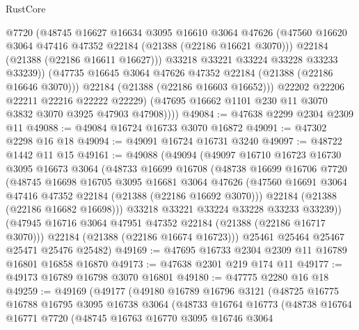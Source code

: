 \begin{lexlean}{RustCore}
\begin{coremodule}
                  @7720
                  (@48745
                    @16627
                    @16634
                    @3095
                    @16610
                    @3064
                    @47626
                    (@47560 @16620 @3064 @47416 @47352 @22184 (@21388 (@22186 @16621 @3070)))
                    @22184
                    (@21388 (@22186 @16611 @16627)))
                  @33218
                  @33221
                  @33224
                  @33228
                  @33233
                  @33239))
              (@47735 @16645 @3064 @47626 @47352 @22184 (@21388 (@22186 @16646 @3070)))
              @22184
              (@21388 (@22186 @16603 @16652)))
            @22202
            @22206
            @22211
            @22216
            @22222
            @22229)
          (@47695 @16662 @1101 @230 @11 @3070 @3832 @3070 @3925 @47903 @47908))))
@49084 := @47638 @2299 @2304 @2309 @11
@49088 := @49084 @16724 @16733 @3070 @16872
@49091 := @47302 @2298 @16 @18
@49094 := @49091 @16724 @16731 @3240
@49097 := @48722 @1442 @11 @15
@49161 := @49088
    (@49094
      (@49097
        @16710
        @16723
        @16730
        @3095
        @16673
        @3064
        (@48733
          @16699
          @16708
          (@48738
            @16699
            @16706
            @7720
            (@48745
              @16698
              @16705
              @3095
              @16681
              @3064
              @47626
              (@47560 @16691 @3064 @47416 @47352 @22184 (@21388 (@22186 @16692 @3070)))
              @22184
              (@21388 (@22186 @16682 @16698)))
            @33218
            @33221
            @33224
            @33228
            @33233
            @33239))
        (@47945 @16716 @3064 @47951 @47352 @22184 (@21388 (@22186 @16717 @3070)))
        @22184
        (@21388 (@22186 @16674 @16723)))
      @25461
      @25464
      @25467
      @25471
      @25476
      @25482)
@49169 := @47695 @16733 @2304 @2309 @11 @16789 @16801 @16858 @16870
@49173 := @47638 @2301 @219 @174 @11
@49177 := @49173 @16789 @16798 @3070 @16801
@49180 := @47775 @2280 @16 @18
@49259 := @49169
    (@49177
      (@49180
        @16789
        @16796
        @3121
        (@48725
          @16775
          @16788
          @16795
          @3095
          @16738
          @3064
          (@48733
            @16764
            @16773
            (@48738
              @16764
              @16771
              @7720
              (@48745
                @16763
                @16770
                @3095
                @16746
                @3064

\end{coremodule}
\end{lexlean}
